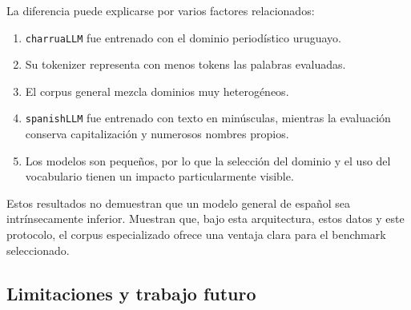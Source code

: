 \documentclass[11pt,a4paper]{article}
\newcommand{\charrua}{\texttt{charruaLLM}}
\newcommand{\spanishmodel}{\texttt{spanishLLM}}
\begin{document}
La diferencia puede explicarse por varios factores relacionados:

\begin{enumerate}
    \item \charrua{} fue entrenado con el dominio periodístico uruguayo.
    \item Su tokenizer representa con menos tokens las palabras evaluadas.
    \item El corpus general mezcla dominios muy heterogéneos.
    \item \spanishmodel{} fue entrenado con texto en minúsculas, mientras la
          evaluación conserva capitalización y numerosos nombres propios.
    \item Los modelos son pequeños, por lo que la selección del dominio y el
          uso del vocabulario tienen un impacto particularmente visible.
\end{enumerate}

Estos resultados no demuestran que un modelo general de español sea
intrínsecamente inferior. Muestran que, bajo esta arquitectura, estos datos y
este protocolo, el corpus especializado ofrece una ventaja clara para el
benchmark seleccionado.


\subsection{Limitaciones y trabajo futuro}
\end{document}
